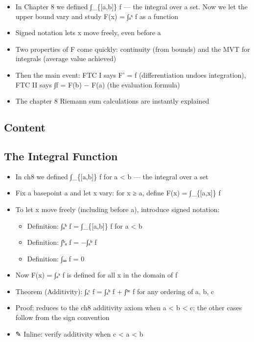 \documentclass[
  10pt,
  letterpaper,
]{scrbook}
\providecommand{\tightlist}{%
  \setlength{\itemsep}{0pt}\setlength{\parskip}{0pt}}
\begin{document}
\begin{itemize}
\tightlist
\item
  In Chapter 8 we defined ∫\_\{{[}a,b{]}\} f --- the integral over a
  set. Now we let the upper bound vary and study F(x) = ∫ₐˣ f as a
  function
\item
  Signed notation lets x move freely, even before a
\item
  Two properties of F come quickly: continuity (from bounds) and the MVT
  for integrals (average value achieved)
\item
  Then the main event: FTC I says F' = f (differentiation undoes
  integration), FTC II says ∫f = F(b) − F(a) (the evaluation formula)
\item
  The chapter 8 Riemann sum calculations are instantly explained
\end{itemize}

\subsection{Content}\label{content-38}

\subsection{The Integral Function}\label{the-integral-function}

\begin{itemize}
\tightlist
\item
  In ch8 we defined ∫\_\{{[}a,b{]}\} f for a \textless{} b --- the
  integral over a set
\item
  Fix a basepoint a and let x vary: for x ≥ a, define F(x) =
  ∫\_\{{[}a,x{]}\} f
\item
  To let x move freely (including before a), introduce signed notation:

  \begin{itemize}
  \tightlist
  \item
    Definition: ∫ₐᵇ f = ∫\_\{{[}a,b{]}\} f for a \textless{} b
  \item
    Definition: ∫ᵇₐ f = −∫ₐᵇ f
  \item
    Definition: ∫ₐₐ f = 0
  \end{itemize}
\item
  Now F(x) = ∫ₐˣ f is defined for all x in the domain of f
\item
  Theorem (Additivity): ∫ₐᶜ f = ∫ₐᵇ f + ∫ᵇᶜ f for any ordering of a, b,
  c
\item
  Proof: reduces to the ch8 additivity axiom when a \textless{} b
  \textless{} c; the other cases follow from the sign convention
\item
  ✎ Inline: verify additivity when c \textless{} a \textless{} b
\end{itemize}
\end{document}
